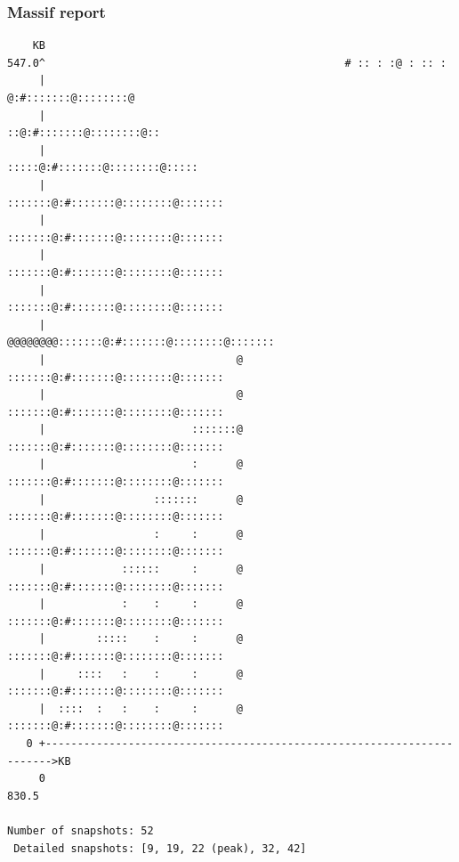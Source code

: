 \begin{frame}[fragile]
  \frametitle{Massif report}
  \begin{block}{}
    \begin{verbatim}
    KB
547.0^                                               # :: : :@ : :: :
     |                                             @:#:::::::@::::::::@
     |                                           ::@:#:::::::@::::::::@::
     |                                        :::::@:#:::::::@::::::::@:::::
     |                                      :::::::@:#:::::::@::::::::@:::::::
     |                                      :::::::@:#:::::::@::::::::@:::::::
     |                                      :::::::@:#:::::::@::::::::@:::::::
     |                                      :::::::@:#:::::::@::::::::@:::::::
     |                              @@@@@@@@:::::::@:#:::::::@::::::::@:::::::
     |                              @       :::::::@:#:::::::@::::::::@:::::::
     |                              @       :::::::@:#:::::::@::::::::@:::::::
     |                       :::::::@       :::::::@:#:::::::@::::::::@:::::::
     |                       :      @       :::::::@:#:::::::@::::::::@:::::::
     |                 :::::::      @       :::::::@:#:::::::@::::::::@:::::::
     |                 :     :      @       :::::::@:#:::::::@::::::::@:::::::
     |            ::::::     :      @       :::::::@:#:::::::@::::::::@:::::::
     |            :    :     :      @       :::::::@:#:::::::@::::::::@:::::::
     |        :::::    :     :      @       :::::::@:#:::::::@::::::::@:::::::
     |     ::::   :    :     :      @       :::::::@:#:::::::@::::::::@:::::::
     |  ::::  :   :    :     :      @       :::::::@:#:::::::@::::::::@:::::::
   0 +----------------------------------------------------------------------->KB
     0                                                                   830.5

Number of snapshots: 52
 Detailed snapshots: [9, 19, 22 (peak), 32, 42]
    \end{verbatim}
  \end{block}
\end{frame}


